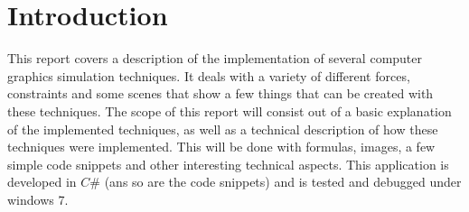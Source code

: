 \chapter{Introduction}

This report covers a description of the implementation of several computer graphics simulation techniques. It deals with a variety of different forces, constraints and some scenes that show a few things that can be created with these techniques. The scope of this report will consist out of a basic explanation of the implemented techniques, as well as a technical description of how these techniques were implemented. This will be done with formulas, images, a few simple code snippets and other interesting technical aspects. This application is developed in $C\#$ (ans so are the code snippets) and is tested and debugged under windows 7.
